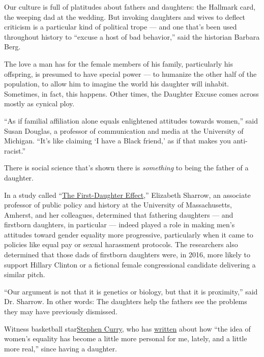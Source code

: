 Our culture is full of platitudes about fathers and daughters: the
Hallmark card, the weeping dad at the wedding. But invoking daughters
and wives to deflect criticism is a particular kind of political trope
--- and one that's been used throughout history to ``excuse a host of
bad behavior,'' said the historian Barbara Berg.

The love a man has for the female members of his family, particularly
his offspring, is presumed to have special power --- to humanize the
other half of the population, to allow him to imagine the world his
daughter will inhabit. Sometimes, in fact, this happens. Other times,
the Daughter Excuse comes across mostly as cynical ploy.

``As if familial affiliation alone equals enlightened attitudes towards
women,'' said Susan Douglas, a professor of communication and media at
the University of Michigan. ``It's like claiming `I have a Black
friend‚' as if that makes you anti-racist.''

There is social science that's shown there is \emph{something} to being
the father of a daughter.

In a study called
``\href{https://academic.oup.com/poq/article-abstract/82/3/493/5095700}{The
First-Daughter Effect},'' Elizabeth Sharrow, an associate professor of
public policy and history at the University of Massachusetts, Amherst,
and her colleagues, determined that fathering daughters --- and
firstborn daughters, in particular --- indeed played a role in making
men's attitudes toward gender equality more progressive, particularly
when it came to policies like equal pay or sexual harassment protocols.
The researchers also determined that those dads of firstborn daughters
were, in 2016, more likely to support Hillary Clinton or a fictional
female congressional candidate delivering a similar pitch.

``Our argument is not that it is genetics or biology, but that it is
proximity,'' said Dr. Sharrow. In other words: The daughters help the
fathers see the problems they may have previously dismissed.

Witness basketball
star\href{https://www.washingtonpost.com/news/monkey-cage/wp/2018/09/14/yes-stephen-curry-is-right-having-a-daughter-does-change-fathers-political-outlooks-but-only-if-shes-the-firstborn/}{Stephen
Curry}, who has
\href{https://www.theplayerstribune.com/en-us/articles/stephen-curry-womens-equality}{written}
about how ``the idea of women's equality has become a little more
personal for me, lately, and a little more real,'' since having a
daughter.

